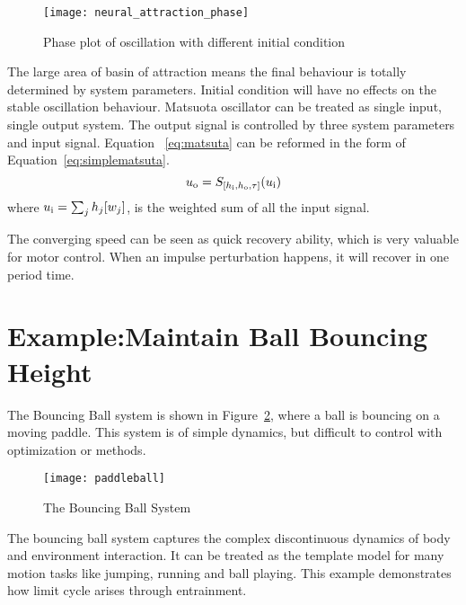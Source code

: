 \begin{figure}
\begin{center}
\texttt{[image: neural\_attraction\_phase]}
\end{center}
\caption{Phase plot of oscillation with different initial condition}
\label{fig:phase_attraction}
\end{figure}
 
The large area of basin of attraction means the final behaviour is totally determined by system parameters. 
Initial condition will have no effects on the stable oscillation behaviour. 
Matsuota oscillator can be treated as single input, single output system.
The output signal is controlled by three system parameters and input signal. 
Equation ~\ref{eq:matsuta} can be reformed in the form of Equation~\ref{eq:simplematsuta}.
\begin{equation}
u_{\mathrm{o}}=S_{[h_{\mathrm{i}},h_{\mathrm{o}},\tau]}(u_{\mathrm{i}})
\label{eq:simplematsuta}
\end{equation}
where $u_{\mathrm{i}}=\sum_{j}h_{j}[w_{j}]$, is the weighted sum of all the input signal.

The converging speed can be seen as quick recovery ability, which is very valuable for motor control.
When an impulse perturbation happens, it will recover in one period time.


\section{Example:Maintain Ball Bouncing Height}
\label{sec:qualyexample}
The Bouncing Ball system is shown in Figure~\ref{fig:bball}, where a ball is bouncing on a moving paddle.
This system is of simple dynamics, but difficult to control with optimization or \pd methods.
\begin{figure}
\begin{center}
\texttt{[image: paddleball]}
\end{center}
\caption{The Bouncing Ball System}
\label{fig:bball}
\end{figure}
 
The bouncing ball system captures the complex discontinuous dynamics of body and environment interaction. 
It can be treated as the template model for many motion tasks like jumping, running and ball playing.
This example demonstrates how limit cycle arises through entrainment.
 

